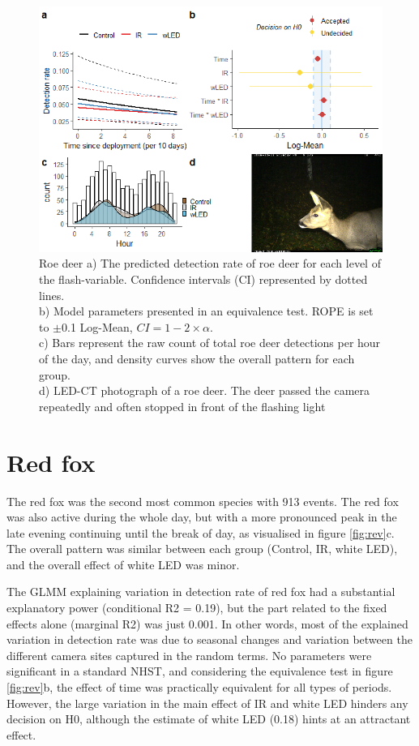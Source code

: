 \begin{table}[ht]
\begin{figure}
\centering
	\includegraphics[scale=.9]{../R/glmm_sp_files/figure-html/parameters-1.png}
\caption[Roe deer]
{Roe deer %
 a) The predicted detection rate of roe deer for each level of the flash-variable. Confidence intervals (CI) represented by dotted lines.\\
b) Model parameters presented in an equivalence test. ROPE is set to $\pm$0.1 Log-Mean, $CI =1 - 2\times \alpha$.\\ 
c) Bars represent the raw count of total roe deer detections per hour of the day, and density curves show the overall pattern for each group.\\
d) LED-CT photograph of a roe deer. The deer passed the camera repeatedly and often stopped in front of the flashing light}\label{fig:raadyr}
\end{figure}


\newpage
\section{Red fox}

The red fox was the second most common species with 913 events.
The red fox was also active during the whole day, but with a more pronounced peak in the late evening continuing until the break of day, as visualised in figure \ref{fig:rev}c.
The overall pattern was similar between each group (Control, IR, white LED), and the overall effect of white LED was minor.

The GLMM explaining variation in detection rate of red fox had a substantial explanatory power (conditional R2 = 0.19), but the part related to the fixed effects alone (marginal R2) was just 0.001.
In other words, most of the explained variation in detection rate was due to seasonal changes and variation between the different camera sites captured in the random terms.
No parameters were significant in a standard NHST, and considering the equivalence test in figure \ref{fig:rev}b, the effect of time was practically equivalent for all types of periods.
However, the large variation in the main effect of  IR and white LED hinders any decision on H0, although the estimate of white LED (0.18) hints at an attractant effect.


\end{table}

